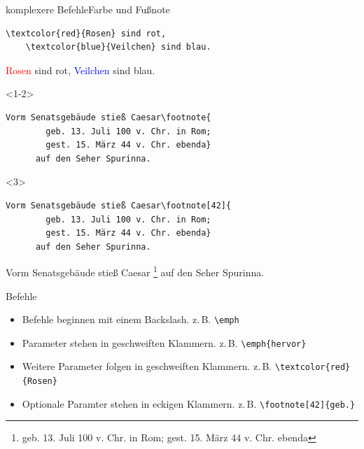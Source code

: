 \begin{Frame}[fragile]{komplexere Befehle}{Farbe und Fußnote}
  \begin{lstlisting}[gobble=4]
    \textcolor{red}{Rosen} sind rot,
    \textcolor{blue}{Veilchen} sind blau.
  \end{lstlisting}
  \textcolor{red}{Rosen} sind rot,
  \textcolor{blue}{Veilchen} sind blau.
  
  \xxx\pause

  \begin{onlyenv}<1-2>
    \begin{lstlisting}[gobble=6]
      Vorm Senatsgebäude stieß Caesar\footnote{
        geb. 13. Juli 100 v. Chr. in Rom;
        gest. 15. März 44 v. Chr. ebenda}
      auf den Seher Spurinna.
    \end{lstlisting}
  \end{onlyenv}
  \begin{onlyenv}<3>
    \begin{lstlisting}[gobble=6]
      Vorm Senatsgebäude stieß Caesar\footnote[42]{
        geb. 13. Juli 100 v. Chr. in Rom;
        gest. 15. März 44 v. Chr. ebenda}
      auf den Seher Spurinna.
    \end{lstlisting}
  \end{onlyenv}
  \begin{minipage}{\textwidth}
    \renewcommand{\thempfootnote}{\arabic{mpfootnote}}
    Vorm Senatsgebäude stieß
      Caesar
        {\footnote[42]{
        geb. 13. Juli 100 v. Chr. in Rom;
        gest. 15. März 44 v. Chr. ebenda}}
      auf den Seher Spurinna.
  \end{minipage}
\end{Frame}

\begin{Frame}[fragile]{Befehle}
  \begin{itemize}
    \item Befehle beginnen mit einem Backslash.\newline
      z.\,B. \lstinline-\emph-
    \item Parameter stehen in geschweiften Klammern.\newline
      z.\,B. \lstinline-\emph{hervor}-
    \item Weitere Parameter folgen in geschweiften Klammern.\newline
      z.\,B. \lstinline-\textcolor{red}{Rosen}-
    \item Optionale Paramter stehen in eckigen Klammern.
      z.\,B. \lstinline-\footnote[42]{geb.}-
  \end{itemize}
\end{Frame}

